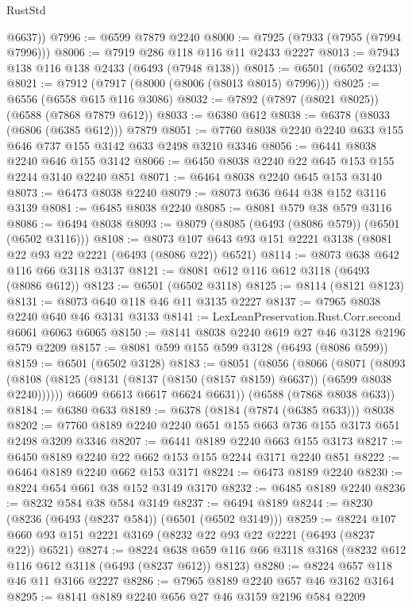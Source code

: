 \begin{lexlean}{RustStd}
\begin{coremodule}
        @6637))
@7996 := @6599 @7879 @2240
@8000 := @7925 (@7933 (@7955 (@7994 @7996)))
@8006 := @7919 @286 @118 @116 @11 @2433 @2227
@8013 := @7943 @138 @116 @138 @2433 (@6493 (@7948 @138))
@8015 := @6501 (@6502 @2433)
@8021 := @7912 (@7917 (@8000 (@8006 (@8013 @8015) @7996)))
@8025 := @6556 (@6558 @615 @116 @3086)
@8032 := @7892 (@7897 (@8021 @8025)) (@6588 (@7868 @7879 @612))
@8033 := @6380 @612
@8038 := @6378 (@8033 (@6806 (@6385 @612))) @7879
@8051 := @7760 @8038 @2240 @2240 @633 @155 @646 @737 @155 @3142 @633 @2498 @3210 @3346
@8056 := @6441 @8038 @2240 @646 @155 @3142
@8066 := @6450 @8038 @2240 @22 @645 @153 @155 @2244 @3140 @2240 @851
@8071 := @6464 @8038 @2240 @645 @153 @3140
@8073 := @6473 @8038 @2240
@8079 := @8073 @636 @644 @38 @152 @3116 @3139
@8081 := @6485 @8038 @2240
@8085 := @8081 @579 @38 @579 @3116
@8086 := @6494 @8038
@8093 := @8079 (@8085 (@6493 (@8086 @579)) (@6501 (@6502 @3116)))
@8108 := @8073 @107 @643 @93 @151 @2221 @3138 (@8081 @22 @93 @22 @2221 (@6493 (@8086 @22)) @6521)
@8114 := @8073 @638 @642 @116 @66 @3118 @3137
@8121 := @8081 @612 @116 @612 @3118 (@6493 (@8086 @612))
@8123 := @6501 (@6502 @3118)
@8125 := @8114 (@8121 @8123)
@8131 := @8073 @640 @118 @46 @11 @3135 @2227
@8137 := @7965 @8038 @2240 @640 @46 @3131 @3133
@8141 := LexLeanPreservation.Rust.Corr.second @6061 @6063 @6065
@8150 := @8141 @8038 @2240 @619 @27 @46 @3128 @2196 @579 @2209
@8157 := @8081 @599 @155 @599 @3128 (@6493 (@8086 @599))
@8159 := @6501 (@6502 @3128)
@8183 := @8051
    (@8056
      (@8066
        (@8071
          (@8093 (@8108 (@8125 (@8131 (@8137 (@8150 (@8157 @8159) @6637)) (@6599 @8038 @2240))))))
        @6609
        @6613
        @6617
        @6624
        @6631))
    (@6588 (@7868 @8038 @633))
@8184 := @6380 @633
@8189 := @6378 (@8184 (@7874 (@6385 @633))) @8038
@8202 := @7760 @8189 @2240 @2240 @651 @155 @663 @736 @155 @3173 @651 @2498 @3209 @3346
@8207 := @6441 @8189 @2240 @663 @155 @3173
@8217 := @6450 @8189 @2240 @22 @662 @153 @155 @2244 @3171 @2240 @851
@8222 := @6464 @8189 @2240 @662 @153 @3171
@8224 := @6473 @8189 @2240
@8230 := @8224 @654 @661 @38 @152 @3149 @3170
@8232 := @6485 @8189 @2240
@8236 := @8232 @584 @38 @584 @3149
@8237 := @6494 @8189
@8244 := @8230 (@8236 (@6493 (@8237 @584)) (@6501 (@6502 @3149)))
@8259 := @8224 @107 @660 @93 @151 @2221 @3169 (@8232 @22 @93 @22 @2221 (@6493 (@8237 @22)) @6521)
@8274 := @8224
    @638
    @659
    @116
    @66
    @3118
    @3168
    (@8232 @612 @116 @612 @3118 (@6493 (@8237 @612)) @8123)
@8280 := @8224 @657 @118 @46 @11 @3166 @2227
@8286 := @7965 @8189 @2240 @657 @46 @3162 @3164
@8295 := @8141 @8189 @2240 @656 @27 @46 @3159 @2196 @584 @2209

\end{coremodule}
\end{lexlean}
